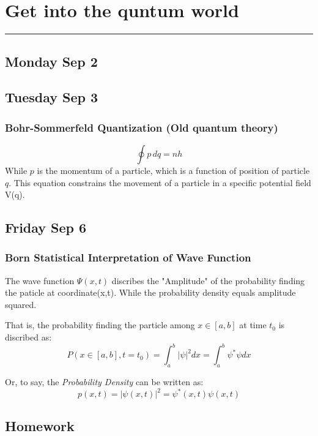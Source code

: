\section{Get into the quntum world}
\vspace{-15pt}\noindent\rule{\textwidth}{0.1pt}\vspace{-10pt}
    \subsection{\hfill \small Monday Sep 2}
    \subsection{\hfill\small Tuesday Sep 3}
    \subsubsection*{Bohr-Sommerfeld Quantization (Old quantum theory)}
    \[
        \oint p \,dq = nh
    \]
    While $p$ is the momentum of a particle, which is a function of position of particle $q$. This equation constrains the movement of a particle in a specific potential field V(q).
    \subsection{\hfill \small Friday Sep 6}
    \subsubsection*{Born Statistical Interpretation of Wave Function}
    The wave function $\Psi (x,t)$ discribes the "Amplitude" of the probability finding the paticle at coordinate(x,t). While the probability density equals amplitude squared.

    That is, the probability finding the particle among $x\in [a,b]$ at time $t_0$ is discribed as:
    \begin{equation*}
        P(x\in [a,b],t=t_0)=\int^{b}_{a}|\psi|^{2}dx=\int^{b}_{a}\psi^*\psi dx
    \end{equation*}

    Or, to say, the \textit{Probability Density} can be written as:
    \begin{equation*}
        p(x,t)=|\psi(x,t)|^2=\psi^{*}(x,t)\psi(x,t)
    \end{equation*}
    \subsection*{Homework}
